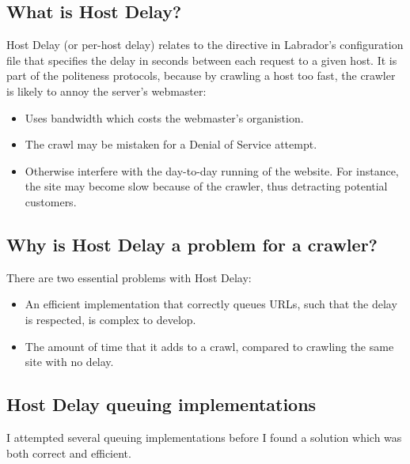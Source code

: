 \subsection{What is Host Delay?}
Host Delay (or per-host delay) relates to the directive in Labrador's configuration file that specifies the delay in seconds between each request to a given host. It is part of the politeness protocols, because by crawling a host too fast, the crawler is likely to annoy the server's webmaster:
\begin{itemize}
\item{Uses bandwidth which costs the webmaster's organistion.}
\item{The crawl may be mistaken for a Denial of Service attempt.}
\item{Otherwise interfere with the day-to-day running of the website. For instance, the site may become slow because of the crawler, thus detracting potential customers.}
\end{itemize}

\subsection{Why is Host Delay a problem for a crawler?}
There are two essential problems with Host Delay:
\begin{itemize}
\item{An efficient implementation that correctly queues URLs, such that the delay is respected, is complex to develop.}
\item{The amount of time that it adds to a crawl, compared to crawling the same site with no delay.}
\end{itemize}


\subsection{Host Delay queuing implementations}\label{sect-hostdelayimpls}
I attempted several queuing implementations before I found a solution which was both correct and efficient.
